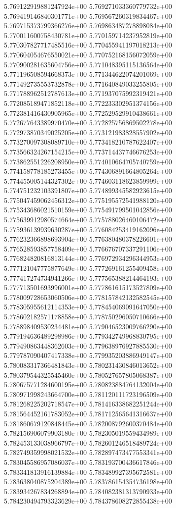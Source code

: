5.769122919881247924e+00
5.769271033360779732e+00
5.769419146840301771e+00
5.769567260319834467e+00
5.769715373799366276e+00
5.769863487278898084e+00
5.770011600758430781e+00
5.770159714237952819e+00
5.770307827717485516e+00
5.770455941197018213e+00
5.770604054676550021e+00
5.770752168156072059e+00
5.770900281635604756e+00
5.771048395115136564e+00
5.771196508594668373e+00
5.771344622074201069e+00
5.771492735553732878e+00
5.771640849033255805e+00
5.771788962512787613e+00
5.771937075992319421e+00
5.772085189471852118e+00
5.772233302951374156e+00
5.772381416430905965e+00
5.772529529910438661e+00
5.772677643389970470e+00
5.772825756869502278e+00
5.772973870349025205e+00
5.773121983828557902e+00
5.773270097308089710e+00
5.773418210787622407e+00
5.773566324267154215e+00
5.773714437746676253e+00
5.773862551226208950e+00
5.774010664705740759e+00
5.774158778185273455e+00
5.774306891664805264e+00
5.774455005144327302e+00
5.774603118623859999e+00
5.774751232103391807e+00
5.774899345582923615e+00
5.775047459062456312e+00
5.775195572541988120e+00
5.775343686021510159e+00
5.775491799501042856e+00
5.775639912980574664e+00
5.775788026460106472e+00
5.775936139939630287e+00
5.776084253419162096e+00
5.776232366898693904e+00
5.776380480378226601e+00
5.776528593857758409e+00
5.776676707337291106e+00
5.776824820816813144e+00
5.776972934296344953e+00
5.777121047775877649e+00
5.777269161255409458e+00
5.777417274734941266e+00
5.777565388214464193e+00
5.777713501693996001e+00
5.777861615173527809e+00
5.778009728653060506e+00
5.778157842132582545e+00
5.778305955612114353e+00
5.778454069091647050e+00
5.778602182571178858e+00
5.778750296050710666e+00
5.778898409530234481e+00
5.779046523009766290e+00
5.779194636489298986e+00
5.779342749968830795e+00
5.779490863448362603e+00
5.779638976927885530e+00
5.779787090407417338e+00
5.779935203886949147e+00
5.780083317366481843e+00
5.780231430846013652e+00
5.780379544325545460e+00
5.780527657805068387e+00
5.780675771284600195e+00
5.780823884764132004e+00
5.780971998243664700e+00
5.781120111723196509e+00
5.781268225202718547e+00
5.781416338682251244e+00
5.781564452161783052e+00
5.781712565641316637e+00
5.781860679120848445e+00
5.782008792600370484e+00
5.782156906079903180e+00
5.782305019559434989e+00
5.782453133038966797e+00
5.782601246518489724e+00
5.782749359998021532e+00
5.782897473477553341e+00
5.783045586957086037e+00
5.783193700436617846e+00
5.783341813916139884e+00
5.783489927395672581e+00
5.783638040875204389e+00
5.783786154354736198e+00
5.783934267834268894e+00
5.784082381313790933e+00
5.784230494793323629e+00
5.784378608272855438e+00
